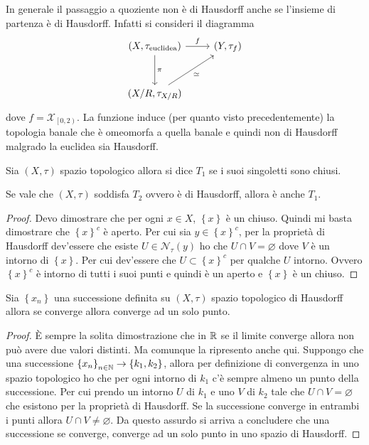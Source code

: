 \begin{remark}
	In generale il passaggio a quoziente non è di Hausdorff anche se l'insieme di partenza è di Hausdorff. Infatti si consideri il diagramma 
	\begin{equation*}
	\begin{tikzcd}[row sep = 3em]
	 (X, \tau_{\text{euclidea}}) \arrow{d}{\pi}\arrow{r}{f} & (Y, \tau_f)\\
	(X/R,\tau_{X/R}) \arrow[swap]{ru}{\simeq} &
	\end{tikzcd}
	\end{equation*}
	dove $f = \mathcal{X}_{\left[0,2\right)}$. La funzione induce (per quanto visto precedentemente) la topologia banale che è omeomorfa a quella banale e quindi non di Hausdorff malgrado la euclidea sia Hausdorff. 
\end{remark} 

\begin{definition}
	Sia $(X, \tau)$ spazio topologico allora si dice $T_1$ se i suoi singoletti sono chiusi. 
\end{definition}

\begin{theorem}
	Se vale che $(X, \tau)$ soddisfa $T_2$ ovvero è di Hausdorff, allora è anche $T_1$.
\end{theorem} 
\begin{proof}
	Devo dimostrare che per ogni $x\in X$, $\left\{x\right\}$ è un chiuso. Quindi mi basta dimostrare che $\left\{x\right\}^c$ è aperto. Per cui sia $y \in \left\{x\right\}^c$, per la proprietà di Hausdorff dev'essere che esiste $U \in \mathcal{N}_\tau(y)$ ho che $U \cap V = \varnothing$ dove $V$ è un intorno di $\left\{x\right\}$. Per cui dev'essere che $U \subset \left\{x\right\}^c$ per qualche $U$ intorno. Ovvero $\left\{x\right\}^c$ è intorno di tutti i suoi punti e quindi è un aperto e $\left\{x\right\}$ è un chiuso.
\end{proof}

\begin{theorem}
	Sia $\left\{x_n\right\}$ una successione definita su $(X, \tau)$ spazio topologico di Hausdorff allora se converge allora converge ad un solo punto. 
\end{theorem} 
\begin{proof}
	È sempre la solita dimostrazione che in $\mathbb{R}$ se il limite converge allora non può avere due valori distinti. Ma comunque la ripresento anche qui. Suppongo che una successione $\left\{x_n\right\}_{n \in \mathbb{N}} \rightarrow \left\{k_1, k_2\right\}$, allora per definizione di convergenza in uno spazio topologico ho che per ogni intorno di $k_1$ c'è sempre almeno un punto della successione. Per cui prendo un intorno $U$ di $k_1$ e uno $V$ di $k_2$ tale che $U \cap V = \varnothing$ che esistono per la proprietà di Hausdorff. Se la successione converge in entrambi i punti allora $U \cap V \neq \varnothing$. Da questo assurdo si arriva a concludere che una successione se converge, converge ad un solo punto in uno spazio di Hausdorff. 
\end{proof}


